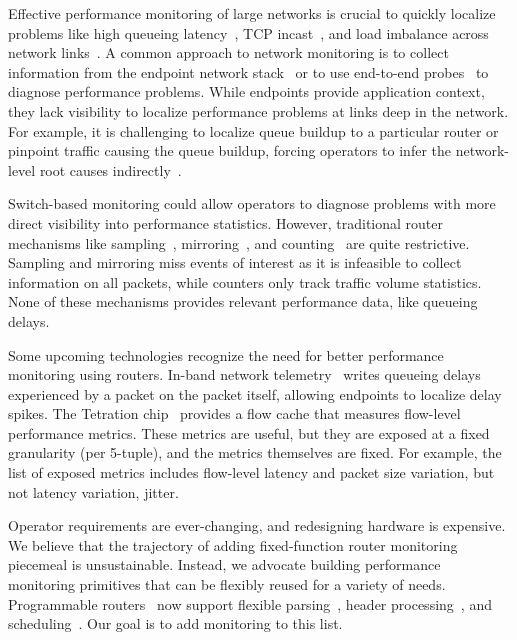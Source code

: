 Effective performance monitoring of large networks is crucial to quickly
localize problems like high queueing latency~\cite{int}, TCP
incast~\cite{tcpincast}, and load imbalance across network links~\cite{conga}.
A common approach to network monitoring is to collect information from the
endpoint network stack~\cite{minlan-snap, pathdump, trumpet} or
to use end-to-end probes~\cite{pingmesh} to diagnose performance problems.  While
endpoints provide application context, they lack visibility to localize
performance problems at links deep in the network. For example, it is
challenging to localize queue buildup to a particular router or pinpoint
traffic causing the queue buildup, forcing operators to infer the network-level
root causes indirectly~\cite{pingmesh}.

Switch-based monitoring could allow operators to diagnose problems with more
direct visibility into performance statistics. However, traditional router
mechanisms like sampling~\cite{netflow, sflow}, mirroring~\cite{cisco-span,
netsight, everflow}, and counting~\cite{cormode, univmon} are quite restrictive.  Sampling
and mirroring miss events of interest as it is infeasible to collect
information on all packets, while counters only track traffic volume
statistics. None of these mechanisms provides relevant performance data, like
queueing delays.

Some upcoming technologies recognize the need for better performance monitoring
using routers. In-band network telemetry~\cite{int} writes queueing delays
experienced by a packet on the packet itself, allowing endpoints to localize
delay spikes. The Tetration chip~\cite{tetration-telemetry} provides
a flow cache that measures flow-level performance metrics.  These metrics are
useful, but they are exposed at a fixed granularity (\eg per 5-tuple), and the metrics themselves
are fixed. For example, the list of exposed metrics includes flow-level latency
and packet size variation, but not latency variation, \ie jitter.

Operator requirements are ever-changing, and redesigning hardware is expensive.
We believe that the trajectory of adding fixed-function router monitoring
piecemeal is unsustainable. Instead, we advocate building performance
monitoring primitives that can be flexibly reused for a variety of
needs. Programmable routers~\cite{flexpipe, tofino, xpliant} now support flexible
parsing~\cite{gibb_parsing}, header processing~\cite{rmt, domino_sigcomm}, and
scheduling~\cite{pifo_sigcomm}. Our goal is to add monitoring to this list.

